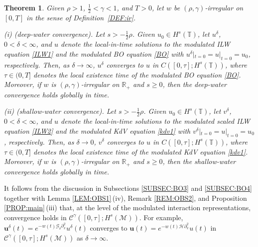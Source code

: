 \documentclass[letterpaper, 11pt,  reqno]{amsart}
\newtheorem{theorem}{Theorem} [section]
\newcommand{\1}{\hspace{0.5mm}\text{I}\hspace{0.5mm}}
\newcommand{\noi}{\noindent}
\newcommand{\R}{\mathbb{R}}
\newcommand{\T}{\mathbb{T}}
\renewcommand{\H}{\mathcal{H}}
\newcommand{\CC}{\mathcal{C}}
\newcommand{\dl}{\delta}
\newcommand{\g}{\gamma}
\newcommand{\dx}{\partial_x}
\newcommand{\Gdl}{\mathcal{G}_{\dl} }
\newcommand{\M}{\mathcal{M}}
\newcommand{\uu}{\mathbf{u}}
\numberwithin{equation}{section}
\numberwithin{theorem}{section}
\begin{document}
\begin{theorem}
\label{THM:conv}
Given $\rho >   1$,  $\frac12< \g < 1$, and $T> 0$, 
let  $w$ be $(\rho,\g)$-irregular on $[0, T]$ in the sense of Definition~\ref{DEF:ir}.






\smallskip

\noi
\textup{(i) (deep-water convergence).}
Let 
$s > - \frac 12 \rho$.
Given $u_0 \in H^s (\T)$,
let $u^\dl$, $0<   \dl < \infty$,  and $u$ denote the local-in-time solutions
to the modulated ILW equation \eqref{ILW1}
and the modulated BO equation \eqref{BO}
with $u^\dl|_{t = 0} = u|_{t = 0} = u_0$, respectively.
Then, as $\dl \to \infty$, 
$u^\dl$ converges to $u$ in 
$C([0, \tau]; H^s(\T))$, 
where $\tau \in (0,  T]$ denotes the local existence time of the modulated BO equation
\eqref{BO}.
Moreover, if 
  $w$ is $(\rho,\g)$-irregular on $\R_+$ 
and 
 $s \ge 0 $, 
then the deep-water convergence holds globally in time.


\smallskip

\noi
\textup{(ii) (shallow-water convergence).}
Let 
$s > - \frac 12 \rho$.
Given $u_0 \in H^s (\T)$,
let $v^\dl$, $0<   \dl < \infty$,  and $u$ denote the local-in-time solutions
to the modulated scaled ILW equation \eqref{ILW2}
and the modulated KdV equation \eqref{kdv1}
with $v^\dl|_{t = 0} = u|_{t = 0} = u_0$, respectively.
Then, as $\dl \to 0$, 
$v^\dl$ converges to $u$ in 
$C([0, \tau]; H^s(\T))$, 
where $\tau \in (0, T]$ denotes the local existence time of the modulated KdV equation
\eqref{kdv1}.
Moreover, if 
  $w$ is $(\rho,\g)$-irregular on $\R_+$ 
and 
 $s \ge 0 $, 
then the shallow-water convergence holds globally in time.

\end{theorem}


It follows from 
the discussion in 
Subsections \ref{SUBSEC:BO3}
and \ref{SUBSEC:BO4}
together with 
Lemma \ref{LEM:OBS1}\,(iv), 
Remark \ref{REM:OBS2}, 
and 
Proposition \ref{PROP:main}\,(iii)
that, at the level of the modulated interaction representations, 
convergence holds
in  $\CC^\g([0, \tau]; H^s(\M))$.
For example, 
$\uu^\dl(t) = e^{-  w(t) \Gdl \dx^2} u^\dl(t)$
converges
to $\uu(t) = e^{ -w(t) \H \dx^2} u(t)$
in  $\CC^\g([0, \tau]; H^s(\M))$
as $\dl \to \infty$.
\end{document}
